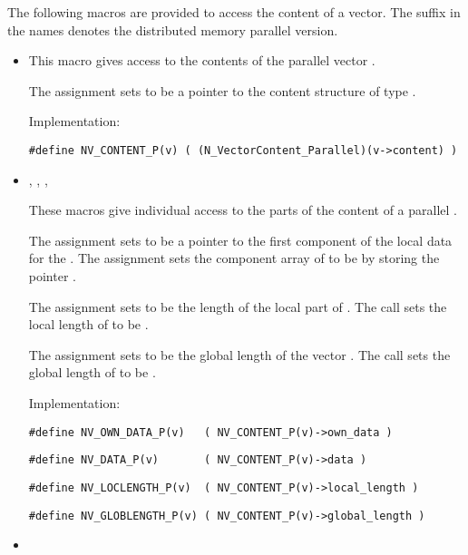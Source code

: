 The following macros are provided to access the content of a {\nvecp}
vector. The suffix  in the names denotes the distributed memory
parallel version.
\begin{itemize}

\item

  This macro gives access to the contents of the parallel
  vector .

  The assignment  sets
   to be a pointer to the  content
  structure of type .

  Implementation:

  \verb|#define NV_CONTENT_P(v) ( (N_VectorContent_Parallel)(v->content) )|

\item
  , ,
  , 

  These macros give individual access to the parts of
  the content of a parallel .

  The assignment  sets  to be
  a pointer to the first component of the local data for the  .
  The assignment  sets the component array of
   to be  by storing the pointer .

  The assignment  sets  to be
  the length of the local part of .
  The call  sets
  the local length of  to be .

  The assignment  sets  to
  be the global length of the vector .
  The call  sets the global
  length of  to be .

  Implementation:

  \verb|#define NV_OWN_DATA_P(v)   ( NV_CONTENT_P(v)->own_data )|

  \verb|#define NV_DATA_P(v)       ( NV_CONTENT_P(v)->data )|

  \verb|#define NV_LOCLENGTH_P(v)  ( NV_CONTENT_P(v)->local_length )|

  \verb|#define NV_GLOBLENGTH_P(v) ( NV_CONTENT_P(v)->global_length )|

\item {}


\end{itemize}
